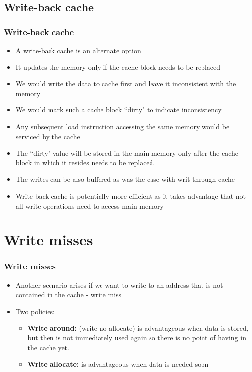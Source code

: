\documentclass{beamer}
\begin{document}
\subsection{Write-back cache}
\begin{frame}
\frametitle{Write-back cache}
\begin{itemize}
\item A {\color{red} write-back cache} is an alternate option
\item It updates the memory only if the cache block needs to be replaced
\item We would write the data to cache first and leave it inconsistent with the memory
\item We would mark such a cache block ``dirty" to indicate inconsistency
\item Any subsequent load instruction accessing the same memory would be serviced by the cache
\item The ``dirty" value will be stored in the main memory only after the cache block in which it resides needs to be replaced.
\item The writes can be also buffered as was the case with writ-through cache
\item Write-back cache is potentially more efficient as it takes advantage that not all write operations need to access main memory
\end{itemize}
\end{frame}
\section{Write misses}
\begin{frame}
\frametitle{Write misses}
\begin{itemize}
\item Another scenario arises if we want to write to an address that is not contained in the cache - {\color{red}write miss}
\item Two policies:
\begin{itemize}
\item \textbf{Write around:} (write-no-allocate) is advantageous when data is stored, but then is not immediately used again so there is no point of having in the cache yet.
\item \textbf{Write allocate:} is advantageous when data is needed soon
\end{itemize}
\end{itemize}
\end{frame}
\end{document}
